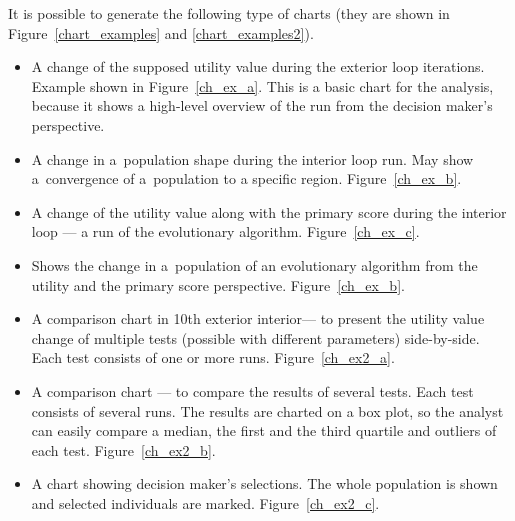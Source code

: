 It is possible to generate the following type of charts (they are shown in
Figure~\ref{chart_examples} and \ref{chart_examples2}).
\begin{itemize}
\item A change of the supposed utility value during the exterior loop
  iterations. Example shown in Figure~\ref{ch_ex_a}. This is a basic chart for
  the analysis, because it shows a high-level overview of the run from the
  decision maker's perspective.
\item A change in a~population shape during the interior loop run. May show
  a~convergence of a~population to a specific region. Figure~\ref{ch_ex_b}.
\item A change of the utility value along with the primary score during the
  interior loop --- a run of the evolutionary algorithm. Figure~\ref{ch_ex_c}.
\item Shows the change in a~population of an evolutionary algorithm from the
  utility and the primary score perspective. Figure~\ref{ch_ex_b}.
\item A comparison chart in 10th exterior interior--- to present the utility
  value change of multiple tests (possible with different parameters)
  side-by-side. Each test consists of one or more runs. Figure~\ref{ch_ex2_a}.
\item A comparison chart --- to compare the results of several tests. Each
  test consists of several runs. The results are charted on a box plot, so the
  analyst can easily compare a median, the first and the third quartile and
  outliers of each test. Figure~\ref{ch_ex2_b}.
\item A chart showing decision maker's selections. The whole population is
  shown and selected individuals are marked. Figure~\ref{ch_ex2_c}.
\end{itemize}

